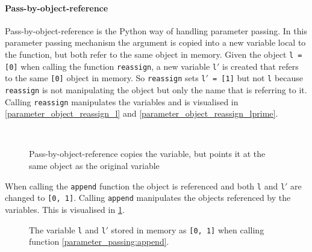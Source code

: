 \paragraph{Pass-by-object-reference}
Pass-by-object-reference is the Python way of handling parameter passing.
In this parameter passing mechanism the argument is copied into a new variable local to the function, but both refer to the same object in memory.
Given the object \texttt{l = [0]} when calling the function \texttt{reassign}, a new variable \texttt{l$'$} is created that refers to the same \texttt{[0]} object in memory.
So \texttt{reassign} sets \texttt{l$'$ = [1]} but not \texttt{l} because \texttt{reassign} is not manipulating the object but only the name that is referring to it.
Calling \texttt{reassign} manipulates the variables and is visualised in \cref{parameter_object_reassign_l} and \cref{parameter_object_reassign_lprime}.

\begin{figure}[H]
  ~
  \caption{Pass-by-object-reference copies the variable, but points it at the same object as the original variable}
\end{figure}

When calling the \texttt{append} function the object is referenced and both \texttt{l} and \texttt{l$'$} are changed to \texttt{[0, 1]}.
Calling \texttt{append} manipulates the objects referenced by the variables.
This is visualised in \cref{parameter_object_append}.

\begin{figure}[h]
   \centering
{}   
  \caption{The variable \texttt{l} and \texttt{l$'$} stored in memory as \texttt{[0, 1]} when calling function \cref{parameter_passing:append}.}
  \label{parameter_object_append}
\end{figure}
